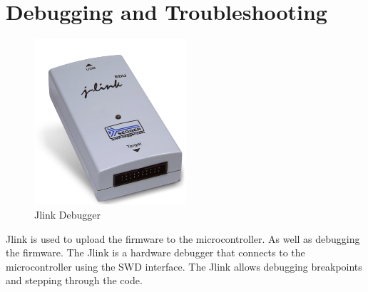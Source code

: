 \section{Debugging and Troubleshooting}
\begin {figure}[h]
\centering
\includegraphics[width=0.5\textwidth]{jlink}
\caption{Jlink Debugger}
\label{fig:Jlink}
\end {figure}


Jlink is used to upload the firmware to the microcontroller.
As well as debugging the firmware.
The Jlink is a hardware debugger that connects to the microcontroller using the SWD interface.
The Jlink allows debugging breakpoints and stepping through the code.


